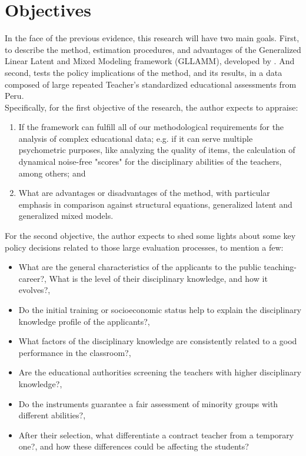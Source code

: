 \section{Objectives}

In the face of the previous evidence, this research will have two main goals. First, to describe the method, estimation procedures, and advantages of the Generalized Linear Latent and Mixed Modeling framework (GLLAMM), developed by \citet{Rabe_et_al_2004a, Rabe_et_al_2004b, Skrondal_et_al_2004a, Rabe_et_al_2012}. And second, tests the policy implications of the method, and its results, in a data composed of large repeated Teacher's standardized educational assessments from Peru. \\

\noindent Specifically, for the first objective of the research, the author expects to appraise: 

\begin{enumerate}
	\item If the framework can fulfill all of our methodological requirements for the analysis of complex educational data; e.g. if it can serve multiple psychometric purposes, like analyzing the quality of items, the calculation of dynamical noise-free "scores" for the disciplinary abilities of the teachers, among others; and
	
	\item What are advantages or disadvantages of the method, with particular emphasis in comparison against structural equations, generalized latent and generalized mixed models.
\end{enumerate}

\noindent For the second objective, the author expects to shed some lights about some key policy decisions related to those large evaluation processes, to mention a few:

\begin{itemize}

	\item What are the general characteristics of the applicants to the public teaching-career?, What is the level of their disciplinary knowledge, and how it evolves?, 
	
	\item Do the initial training or socioeconomic status help to explain the disciplinary knowledge profile of the applicants?,
	
	\item What factors of the disciplinary knowledge are consistently related to a good performance in the classroom?,
	
	\item Are the educational authorities screening the teachers with higher disciplinary knowledge?,
	
	\item Do the instruments guarantee a fair assessment of minority groups with different abilities?,
	
	\item After their selection, what differentiate a contract teacher from a temporary one?, and how these differences could be affecting the students?   
\end{itemize}

